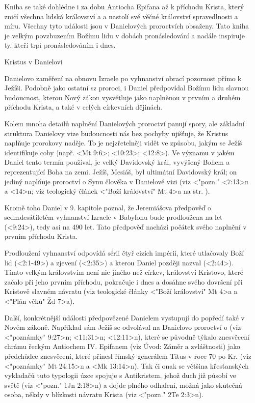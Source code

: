 Kniha se také dohlédne i za dobu Antiocha Epifana až k příchodu Krista, který zničí všechna lidská království a
a nastolí své věčné království spravedlnosti a míru.
Všechny tyto události jsou  v Danielových proroctvích obsaženy.
Tato kniha je velkým povzbuzením Božímu lidu v dobách pronásledování a nadále inspiruje ty, kteří trpí pronásledováním i dnes.


Kristus v Danielovi

Danielovo zaměření na obnovu Izraele po vyhnanství obrací pozornost  přímo k Ježíši.
Podobně jako ostatní sz proroci, i Daniel předpovídal Božímu lidu slavnou budoucnost, kterou Nový zákon vysvětluje jako
naplněnou v prvním a druhém příchodu Krista, a také v celých církevních dějinách.

Kolem mnoha detailů naplnění Danielových proroctví panují spory, ale základní
struktura Danielovy vize budoucnosti nás bez pochyby ujišťuje, že Kristus naplňuje prorokovy naděje.
To je nejzřetelněji vidět ve způsobu, jakým se Ježíš identifikuje
coby   (např. <Mt 9:6>; <10:23>; <12:8>).
Ve významu v jakém Daniel tento termín používal, je  velký Davidovský král, vyvýšený Bohem a reprezentující Boha na zemi.
Ježíš, Mesiáš, byl ultimátní Davidovský král; on jediný naplňuje proroctví o Synu člověka v Danielově vizi (viz <"pozn."  <7:13>n a <14>n;
viz teologický článek <"Boží království" Mt 4>a na str. \pg).

Kromě toho Daniel v 9. kapitole poznal, že Jeremiášova předpověď o sedmdesátiletém  vyhnanství Izraele v Babylonu
bude prodloužena na  let (<9:24>), tedy asi na 490 let.
Tato předpověď nachází počátek svého naplnění v prvním příchodu Krista.

Prodloužení vyhnanství odpovídá sérii čtyř cizích impérií, které utlačovaly Boží lid (<2:1-49>)
a zjevení  (<2:35>) a
kterou Daniel později nazval  (<2:44>).
Tímto velkým královstvím není nic jiného než církev, království Kristovo, které začalo při jeho prvním
příchodu, pokračuje i dnes a dosáhne svého dovršení při Kristově slavném návratu (viz teologické články
<"Boží království"  Mt 4>a a <"Plán věků" Žd 7>a).

Další, konkrétnější události předpovězené Danielem vystupují do popředí také v Novém zákoně.
Například sám Ježíš se odvolával na Danielovo proroctví o 
(viz <"poznámky" 9:27>n; <11:31>n; <12:11>n), které se původně týkalo znesvěcení chrámu řeckým Antiochem IV. Epifanem
(viz Úvod: Záměr a zvláštnosti) jako předchůdce znesvěcení, které přinesl římský generálem Titus v roce  70 po Kr.
(viz <"poznámky"  Mt 24:15>n a <Mk 13:14>n).
Tak či onak se většina křesťanských vykladačů tuto typologii úzce spojuje s Antikristem, jehož duch již působí ve světě
(viz <"pozn."  1Jn 2:18>n) a dojde plného odhalení, možná jako skutečná osoba, někdy v blízkosti návratu Krista
(viz <"pozn." 2Te 2:3>n).


